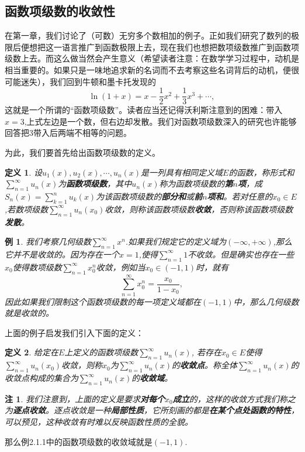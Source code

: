 \documentclass{article}
\newtheorem{definition}{定义}[subsection]
\newtheorem{example}{例}[subsection]
\newtheorem{note}{注}[subsection]
\begin{document}
\subsection{函数项级数的收敛性}
在第一章，我们讨论了（可数）无穷多个数相加的例子。正如我们研究了数列的极限后便想把这一语言推广到函数极限上去，现在我们也想把数项级数推广到函数项级数上去。而这么做当然会产生意义（希望读者注意：在数学学习过程中，动机是相当重要的。如果只是一味地追求新的名词而不去考察这些名词背后的动机，便很可能迷失），我们回到牛顿和墨卡托发现的
$$\ln(1+x)=x-\frac{1}{2}x^2+\frac{1}{3}x^3+\cdots,$$
这就是一个所谓的“函数项级数”。读者应当还记得沃利斯注意到的困难：带入$x=3$,上式左边是一个数，但右边却发散。我们对函数项级数深入的研究也许能够回答把$3$带入后两端不相等的问题。\par
为此，我们要首先给出函数项级数的定义。
\begin{definition}
设$u_1(x),u_2(x),\cdots,u_n(x)$是一列具有相同定义域$E$的函数，称形式和$\sum_{n=1}^\infty u_n(x)$为\textbf{函数项级数}，其中$u_n(x)$称为函数项级数的\textbf{第$n$项}，成$S_n(x)=\sum_{k=1}^n u_k(x)$为该函数项级数的\textbf{部分和}或\textbf{前$n$项和}。若对任意的$x_0\in E$,若数项级数$\sum_{n=1}^\infty u_n(x_0)$收敛，则称该函数项级数\textbf{收敛}，否则称该函数项级数\textbf{发散}。
\end{definition}
\begin{example}
我们考察几何级数$\sum_{n=1}^\infty x^n$.如果我们规定它的定义域为$(-\infty,+\infty)$,那么它并不是收敛的。因为存在一个$x=1$,使得$\sum_{n=1}^\infty 1$不收敛。但是确实也存在一些$x_0$使得数项级数$\sum_{n=1}^\infty x_0^n$收敛，例如当$x_0\in(-1,1)$时，就有
$$\sum_{n=1}^\infty x_0^n=\frac{x_0}{1-x_0},$$
因此如果我们限制这个函数项级数的每一项定义域都在$(-1,1)$中，那么几何级数就是收敛的。
\end{example}
上面的例子启发我们引入下面的定义：
\begin{definition}
给定在$E$上定义的函数项级数$\sum_{n=1}^\infty u_n(x)$, 若存在$x_0\in E$使得$\sum_{n=1}^\infty u_n(x_0)$收敛，则称$x_0$为$\sum_{n=1}^\infty u_n(x)$的\textbf{收敛点}。称全体$\sum_{n=1}^\infty u_n(x)$的收敛点构成的集合为$\sum_{n=1}^\infty u_n(x)$的\textbf{收敛域}。
\end{definition}
\begin{note}
我们注意到，上面的定义是要求\textbf{对每个$x_0$成立}的，这样的收敛方式我们称之为\textbf{逐点收敛}。逐点收敛是一种\textbf{局部性质}，它所刻画的都是\textbf{在某个点处函数的特性}，可以预见，这种收敛有时难以反映函数性质的全貌。
\end{note}
那么例2.1.1中的函数项级数的收敛域就是$(-1,1)$.\par
\end{document}
